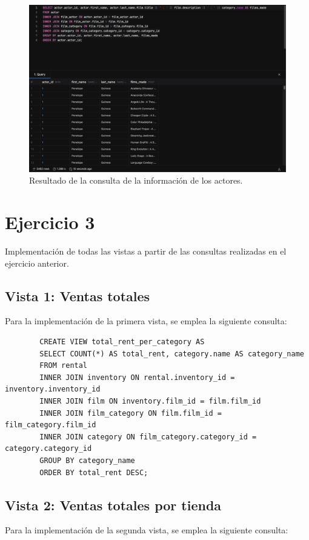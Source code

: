 \documentclass{report}
\begin{document}
	\begin{figure}[H]
		\centering
		\includegraphics[scale=0.5]{img/Exercice-2.2.4-Comprobation.png}
		\caption{Resultado de la consulta de la información de los actores.}
		\label{fig:Exercice-2-4}
	\end{figure}

	\section{Ejercicio 3}
	Implementación de todas las vistas a partir de las consultas realizadas en el ejercicio anterior.\\

	\subsection{Vista 1: Ventas totales}
	Para la implementación de la primera vista, se emplea la siguiente consulta:

	\begin{verbatim}
		CREATE VIEW total_rent_per_category AS
		SELECT COUNT(*) AS total_rent, category.name AS category_name
		FROM rental
		INNER JOIN inventory ON rental.inventory_id = inventory.inventory_id
		INNER JOIN film ON inventory.film_id = film.film_id
		INNER JOIN film_category ON film.film_id = film_category.film_id
		INNER JOIN category ON film_category.category_id = category.category_id
		GROUP BY category_name
		ORDER BY total_rent DESC;
	\end{verbatim}
	
	\subsection{Vista 2: Ventas totales por tienda}
	Para la implementación de la segunda vista, se emplea la siguiente consulta:
\end{document}
